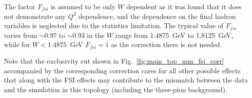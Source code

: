 The factor $F_{fsi}$ is assumed to be only $W$ dependent as it was found that it does not demonstrate any $Q^{2}$ dependence, and the dependence on the final hadron variables is neglected due to the statistics limitation. The typical value of $F_{fsi}$ varies from $\sim$0.97 to $\sim$0.93 in the $W$ range from 1.4875~GeV to 1.8125~GeV, while for $W < 1.4875$~GeV $F_{fsi}=1$ as the correction there is not needed.


Note that the exclusivity cut shown in Fig.~\ref{fig:main_top_mm_fsi_corr} accompanied by the corresponding correction cares for all other possible effects that along with the FSI effects may contribute to the mismatch between the data and the simulation in this topology (including the three-pion background).

